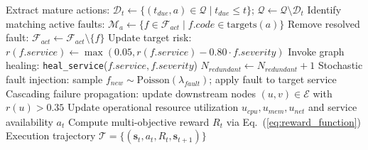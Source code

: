 \documentclass[11pt,a4paper]{article}
\begin{document}
\begin{algorithm}[!htbp]
\begin{algorithmic}[1]
            \EndIf
        \EndIf
    \EndIf
    \State Extract mature actions: $\mathcal{D}_t \leftarrow \{(t_{due}, a) \in \mathcal{Q} \mid t_{due} \le t\}$; $\mathcal{Q} \leftarrow \mathcal{Q} \setminus \mathcal{D}_t$
     
        \State Identify matching active faults: $\mathcal{M}_a \leftarrow \{f \in \mathcal{F}_{act} \mid f.code \in \text{targets}(a)\}$
         
                \State Remove resolved fault: $\mathcal{F}_{act} \leftarrow \mathcal{F}_{act} \setminus \{f\}$
                \State Update target risk: $r(f.service) \leftarrow \max(0.05, r(f.service) - 0.80 \cdot f.severity)$
                \State Invoke graph healing: \texttt{heal\_service}($f.service, f.severity$)
            \EndFor
        \Else {}
            \State $N_{redundant} \leftarrow N_{redundant} + 1$ 
        \EndIf
    \EndFor
    \State Stochastic fault injection: sample $f_{new} \sim \text{Poisson}(\lambda_{fault})$; apply fault to target service
    \State Cascading failure propagation: update downstream nodes $(u, v) \in \mathcal{E}$ with $r(u) > 0.35$
    \State Update operational resource utilization $u_{cpu}, u_{mem}, u_{net}$ and service availability $a_t$
    \State Compute multi-objective reward $R_t$ via Eq.~(\ref{eq:reward_function})
\EndWhile
\State \Return Execution trajectory $\mathcal{T} = \{(\mathbf{s}_t, a_t, R_t, \mathbf{s}_{t+1})\}$
\end{algorithmic}
\end{algorithm}
\end{document}
